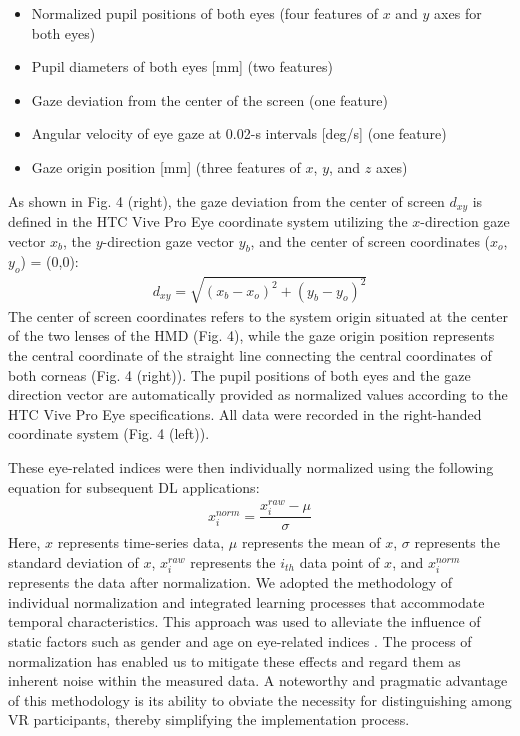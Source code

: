 \documentclass{ieeeaccess}
\begin{document}
\begin{itemize}
    \item Normalized pupil positions of both eyes (four features of $x$ and $y$ axes for both eyes)
    \item Pupil diameters of both eyes [mm] (two features)
    \item Gaze deviation from the center of the screen (one feature)
    \item Angular velocity of eye gaze at 0.02-s intervals [deg/s] (one feature)
    \item Gaze origin position [mm] (three features of $x$, $y$, and $z$ axes)
\end{itemize}

As shown in Fig. 4 (right), the gaze deviation from the center of screen $d_{xy}$ is defined in the HTC Vive Pro Eye coordinate system utilizing the $x$-direction gaze vector $x_b$, the $y$-direction gaze vector $y_b$, and the center of screen coordinates ($x_o$, $y_o$) = (0,0):
\begin{align}
    d_{xy}=\sqrt{(x_b-x_o)^2+(y_b-y_o)^2}
\end{align}
The center of screen coordinates refers to the system origin situated at the center of the two lenses of the HMD (Fig. 4), while the gaze origin position represents the central coordinate of the straight line connecting the central coordinates of both corneas (Fig. 4 (right)). 
The pupil positions of both eyes and the gaze direction vector are automatically provided as normalized values according to the HTC Vive Pro Eye specifications. All data were recorded in the right-handed coordinate system (Fig. 4 (left)). 

These eye-related indices were then individually normalized using the following equation for subsequent DL applications:
\begin{align}
    x_i^{norm} = \dfrac{x_i^{raw} - \mu}{\sigma}
\label{eq_norm}
\end{align}
Here, $x$ represents time-series data, $\mu$ represents the mean of $x$, $\sigma$ represents the standard deviation of $x$, $x_i^{raw}$ represents the $i_{th}$ data point of $x$, and $x_i^{norm}$ represents the data after normalization. We adopted the methodology of individual normalization and integrated learning processes that accommodate temporal characteristics. This approach was used to alleviate the influence of static factors such as gender and age on eye-related indices \cite{Cantoni_2020}. The process of normalization has enabled us to mitigate these effects and regard them as inherent noise within the measured data. A noteworthy and pragmatic advantage of this methodology is its ability to obviate the necessity for distinguishing among VR participants, thereby simplifying the implementation process. 
\end{document}
